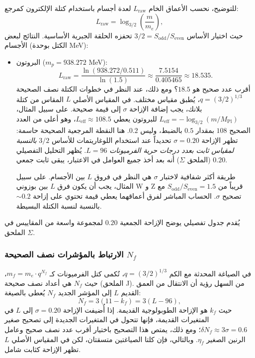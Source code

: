 \documentclass[11pt,a4paper]{article}
\begin{document}
	للتوضيح، نحسب الأعماق الخام \(L_{\mathrm{raw}}\) لعدة أجسام باستخدام كتلة الإلكترون كمرجع:
	\[
	L_{\mathrm{raw}} = \log_{3/2}\left( \frac{m}{m_e} \right),
	\]
	حيث اختيار الأساس \(3/2 = S_{\mathrm{odd}}/S_{\mathrm{even}}\) تحفزه الحلقة الجبرية الأساسية. النتائج لبعض الأجسام (الكتل بوحدة MeV):
	\begin{itemize}
		\item البروتون (\(m_p = 938.272\) MeV):
		\[
		L_{\mathrm{raw}} = \frac{\ln(938.272 / 0.511)}{\ln(1.5)} \approx \frac{7.5154}{0.405465} \approx 18.535.
		\]
		أقرب عدد صحيح هو \(18.5\)؟ ومع ذلك، عند النظر في خطوات الكتلة نصف الصحيحة \(q = (3/2)^{1/3}\)، يُطبق مقياس مختلف. في المقياس الأصلي \(L\) المقاس من كتلة بلانك، يجب إضافة الإزاحة \(\sigma\) إلى قيمة صحيحة. على سبيل المثال، \(L_{\mathrm{eff}} = -\log_{3/2}(m/M_{\mathrm{Pl}})\) للبروتون يعطي \(L_{\mathrm{eff}} \approx 108.5\)، وهو أعلى من العدد الصحيح \(108\) بمقدار \(0.5\) بالضبط، وليس \(0.2\). هنا النقطة المرجعية الصحيحة حاسمة: تظهر الإزاحة \(\sigma = 0.20\) تحديداً عند استخدام اللوغاريتمات للأساس \(3/2\) \emph{بالنسبة لمقياس ثابت بعدد درجات حرية الفرميونات} \(L=96\). يُظهر التحليل التفصيلي (الملحق \(\Sigma\)) أنه بعد أخذ جميع العوامل في الاعتبار، يبقى ثابت جمعي \(0.20\).
		
		طريقة أكثر شفافية لاختبار \(\sigma\) هي النظر في فروق \(L\) بين الأجسام. على سبيل المثال، يجب أن يكون فرق \(L\) بين بوزوني W و Z قريباً من \(S_{\mathrm{odd}}/S_{\mathrm{even}} = 1.5\) مع تصحيح \(\sigma\). الحساب المباشر لفرق أعماقهما يعطي قيمة تحتوي على إزاحة \(\sim 0.2\) بالنسبة لنسبة الكتلة البسيطة.
	\end{itemize}
	
	يُقدم جدول تفصيلي يوضح الإزاحة الجمعية \(0.20\) لمجموعة واسعة من المقاييس في الملحق \(\Sigma\).
	
	\subsubsection{الارتباط بالمؤشرات نصف الصحيحة \(N_f\)}
	
	في الصياغة المحدثة مع الكم \(q = (3/2)^{1/3}\)، تُكمى كتل الفرميونات كـ \(m_f = m_e \cdot q^{N_f}\)، حيث \(N_f\) هي أعداد نصف صحيحة (الملحق J). من السهل رؤية أن الانتقال من العمق القديم \(L\) إلى المؤشر الجديد \(N_f\) يُعطى بالصيغة:
	\[
	N_f = 3(11 - k_f) = 3(L - 96),
	\]
	حيث \(k_f\) هو الإزاحة الطوبولوجية القديمة. إذا أُضيفت الإزاحة \(\sigma = 0.20\) إلى \(L\) في المتغيرات القديمة، فإنها تتحول في المتغيرات الجديدة إلى تصحيح صغير \(\delta N_f \approx 3\sigma = 0.6\)؛ ومع ذلك، يمتص هذا التصحيح باختيار أقرب عدد نصف صحيح وعامل الرنين الصغير \(\eta_f\). وبالتالي، فإن كلتا الصياغتين متسقتان، لكن في المقياس الأصلي \(L\) تظهر الإزاحة كثابت شامل.
	
\end{document}
